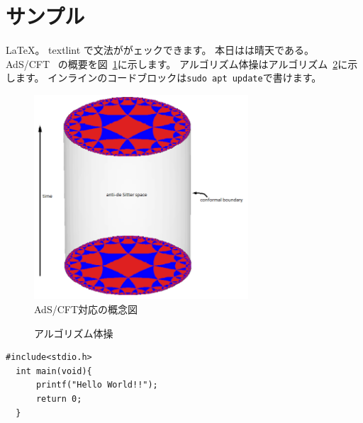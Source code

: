 \documentclass[a4paper,10pt]{ltjsarticle}
\begin{document}
\section{サンプル}

\LaTeX。
textlint で文法ががェックできます。
本日はは晴天である。
AdS/CFT~\cite{maldacena1999large}
の概要を図~\ref{fig:adscft}に示します。
アルゴリズム体操はアルゴリズム~\ref{alg:excersise}に示します。
インラインのコードブロックは\lstinline|sudo apt update|で書けます。

\begin{figure}[tbp]
  \begin{center}
    \includegraphics[width=8cm]{img/sample.png}
    \caption{AdS/CFT対応の概念図~\cite{adscftwiki}}
  \end{center}
  \label{fig:adscft}
\end{figure}

\begin{figure}[tbp]
  \begin{algorithm}[H]
    \caption{アルゴリズム体操}
    \label{alg:excersise}
    \begin{algorithmic}
      \EndFor
      \EndFunction
    \end{algorithmic}
  \end{algorithm}
\end{figure}

\begin{lstlisting}[caption=listing,label=listTest]
  #include<stdio.h>
  int main(void){
      printf("Hello World!!");
      return 0;
  }
\end{lstlisting}


\end{document}
